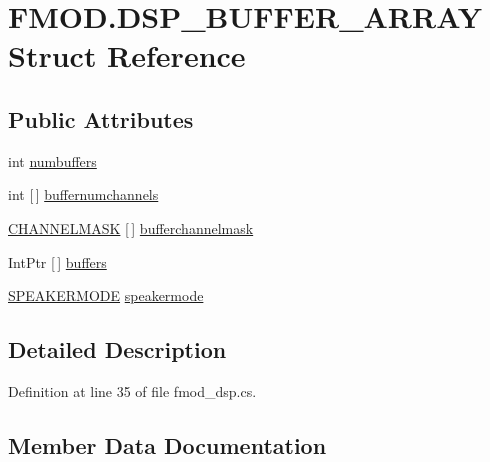 \hypertarget{struct_f_m_o_d_1_1_d_s_p___b_u_f_f_e_r___a_r_r_a_y}{}\section{F\+M\+O\+D.\+D\+S\+P\+\_\+\+B\+U\+F\+F\+E\+R\+\_\+\+A\+R\+R\+AY Struct Reference}
\label{struct_f_m_o_d_1_1_d_s_p___b_u_f_f_e_r___a_r_r_a_y}
\subsection*{Public Attributes}
\begin{DoxyCompactItemize}
\item 
int \hyperlink{struct_f_m_o_d_1_1_d_s_p___b_u_f_f_e_r___a_r_r_a_y_ac9a3e12220991623424ea232b2365781}{numbuffers}
\item 
int \mbox{[}$\,$\mbox{]} \hyperlink{struct_f_m_o_d_1_1_d_s_p___b_u_f_f_e_r___a_r_r_a_y_af33521926d5778e6168075359406717f}{buffernumchannels}
\item 
\hyperlink{namespace_f_m_o_d_ae295945ff00acb5f2e5ef0b3f217f5e2}{C\+H\+A\+N\+N\+E\+L\+M\+A\+SK} \mbox{[}$\,$\mbox{]} \hyperlink{struct_f_m_o_d_1_1_d_s_p___b_u_f_f_e_r___a_r_r_a_y_a37fb89ab1bc5e5c5a8313b0f2903fa7c}{bufferchannelmask}
\item 
Int\+Ptr \mbox{[}$\,$\mbox{]} \hyperlink{struct_f_m_o_d_1_1_d_s_p___b_u_f_f_e_r___a_r_r_a_y_a738b7e61525eea32182ad85bd17fcbc7}{buffers}
\item 
\hyperlink{namespace_f_m_o_d_aa0732e7e8efd3b96b526a7f2f8479634}{S\+P\+E\+A\+K\+E\+R\+M\+O\+DE} \hyperlink{struct_f_m_o_d_1_1_d_s_p___b_u_f_f_e_r___a_r_r_a_y_a96bc77daa9da48ae563e581b521e9d52}{speakermode}
\end{DoxyCompactItemize}


\subsection{Detailed Description}


Definition at line 35 of file fmod\+\_\+dsp.\+cs.



\subsection{Member Data Documentation}
\mbox{\label{struct_f_m_o_d_1_1_d_s_p___b_u_f_f_e_r___a_r_r_a_y_a37fb89ab1bc5e5c5a8313b0f2903fa7c}} 
